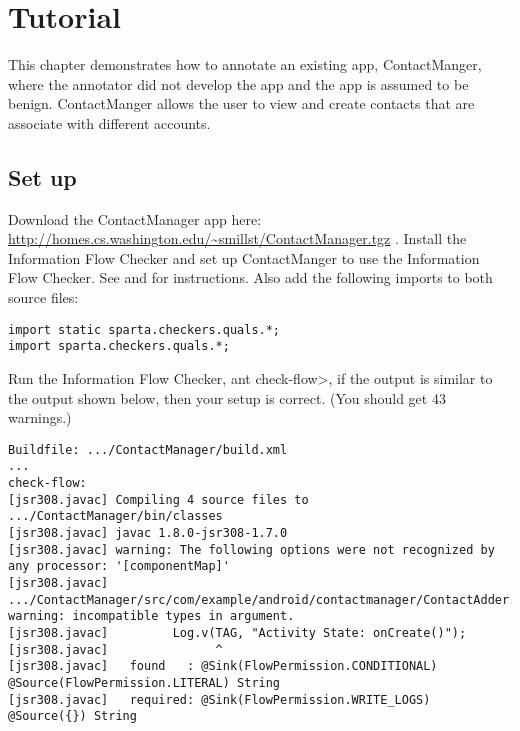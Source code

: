 \htmlhr


\newcommand{\method}[1]{\paragraph{#1}}
\newcommand{\annomethod}[1]{\small{\texttt{#1}}\newline}
\chapter{Tutorial\label{tutorial}}

This chapter demonstrates how to annotate an existing app, ContactManger,
 where the annotator did not develop the app and the app is assumed to be benign.
   ContactManger allows the user to view and create contacts that are associate 
   with different accounts.  


\section{Set up}
Download the ContactManager app here: \url{http://homes.cs.washington.edu/~smillst/ContactManager.tgz} . 
Install the Information Flow Checker and set up ContactManger to use the Information Flow Checker. 
See   and  for instructions. Also add 
the following imports to both source files:
\begin{Verbatim} 
import static sparta.checkers.quals.*;
import sparta.checkers.quals.*;
\end{Verbatim}

Run the Information Flow Checker, \<ant check-flow>, if the output is similar to 
the output shown below, then your setup is correct.  (You should get 43 warnings.)

\begin{Verbatim}
Buildfile: .../ContactManager/build.xml
...
check-flow:
[jsr308.javac] Compiling 4 source files to .../ContactManager/bin/classes
[jsr308.javac] javac 1.8.0-jsr308-1.7.0
[jsr308.javac] warning: The following options were not recognized by any processor: '[componentMap]'
[jsr308.javac] .../ContactManager/src/com/example/android/contactmanager/ContactAdder.java:75: warning: incompatible types in argument.
[jsr308.javac]         Log.v(TAG, "Activity State: onCreate()");
[jsr308.javac]               ^
[jsr308.javac]   found   : @Sink(FlowPermission.CONDITIONAL) @Source(FlowPermission.LITERAL) String
[jsr308.javac]   required: @Sink(FlowPermission.WRITE_LOGS) @Source({}) String
\end{Verbatim} 

